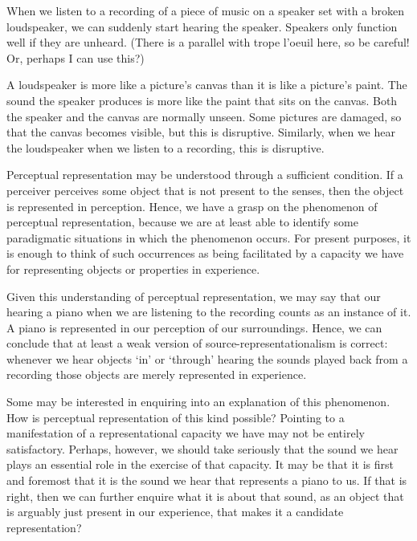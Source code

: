 \documentclass[sloppy, journal, git, bytitle, dodraft]{humapap}
\begin{document}
When we listen to a recording of a piece of music on a speaker set with a broken loudspeaker, we can suddenly start hearing the speaker. Speakers only function well if they are unheard. (There is a parallel with trope l'oeuil here, so be careful! Or, perhaps I can use this?) 

A loudspeaker is more like a picture's canvas than it is like a picture's paint. The sound the speaker produces is more like the paint that sits on the canvas. Both the speaker and the canvas are normally unseen. Some pictures are damaged, so that the canvas becomes visible, but this is disruptive. Similarly, when we hear the loudspeaker when we listen to a recording, this is disruptive. 


\sect Perceptual representation may be understood through a sufficient condition. If a perceiver perceives some object that is not present to the senses, then the object is represented in perception. Hence, we have a grasp on the phenomenon of perceptual representation, because we are at least able to identify some paradigmatic situations in which the phenomenon occurs. For present purposes, it is enough to think of such occurrences as being facilitated by a capacity we have for representing objects or properties in experience. 

Given this understanding of perceptual representation, we may say that our hearing a piano when we are listening to the recording counts as an instance of it. A piano is represented in our perception of our surroundings. Hence, we can conclude that at least a weak version of source-representationalism is correct: whenever we hear objects `in' or `through' hearing the sounds played back from a recording those objects are merely represented in experience. 

Some may be interested in enquiring into an explanation of this phenomenon. How is perceptual representation of this kind possible? Pointing to a manifestation of a representational capacity we have may not be entirely satisfactory. Perhaps, however, we should take seriously that the sound we hear plays an essential role in the exercise of that capacity. It may be that it is first and foremost that it is the sound we hear that represents a piano to us. If that is right, then we can further enquire what it is about that sound, as an object that is arguably just present in our experience, that makes it a candidate representation? 
\end{document}
